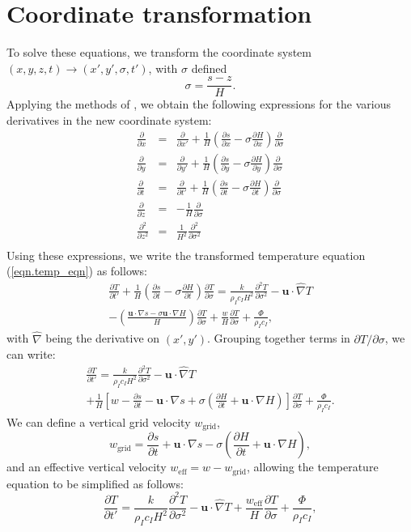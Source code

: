 \documentclass[10pt,english,a4paper]{article}
\newcommand{\diffn}[2]{\ensuremath{\frac{\partial #1}{\partial #2}}}
\newcommand{\diffnsq}[2]{\ensuremath{\frac{\partial^2 #1}{\partial #2^2}}}
\begin{document}
\section{Coordinate transformation}
%
To solve these equations, we transform the coordinate system
$(x,y,z,t)\rightarrow (x',y',\sigma,t')$, with $\sigma$ defined
%
\begin{equation}
\sigma = \frac{s-z}{H}.
\label{eqn.defn_sigma}
\end{equation}
%
Applying the methods of \citet{Hindmarsh1988}, we obtain the following
expressions for the various derivatives in the new coordinate system:
%
\begin{eqnarray}
\diffn{}{x} &=& \diffn{}{x'}+\frac{1}{H}\left(\diffn{s}{x}-\sigma\diffn{H}{x}\right)\diffn{}{\sigma}\\
\diffn{}{y} &=& \diffn{}{y'}+\frac{1}{H}\left(\diffn{s}{y}-\sigma\diffn{H}{y}\right)\diffn{}{\sigma}\\
\diffn{}{t} &=& \diffn{}{t'}+\frac{1}{H}\left(\diffn{s}{t}-\sigma\diffn{H}{t}\right)\diffn{}{\sigma}\\
\diffn{}{z} &=& -\frac{1}{H}\diffn{}{\sigma}\\
\diffnsq{}{z} &=& \frac{1}{H^2}\diffnsq{}{\sigma}\\
\end{eqnarray}
%
Using these expressions, we write the transformed temperature equation
(\ref{eqn.temp_eqn}) as follows:
%
\begin{multline}
\diffn{T}{t'}+\frac{1}{H}\left(\diffn{s}{t}-\sigma\diffn{H}{t}\right)\diffn{T}{\sigma}
= \frac{k}{\rho_I c_I H^2}\diffnsq{T}{\sigma} -
\mathbf{u}\cdot\hat{\nabla}T\\ 
- \left(\frac{\mathbf{u}\cdot \nabla s
  -\sigma \mathbf{u}\cdot\nabla H}{H}\right)\diffn{T}{\sigma} +\frac{w}{H}\diffn{T}{\sigma}+\frac{\Phi}{\rho_I c_I},
\end{multline}
%
with $\hat{\nabla}$ being the derivative on $(x',y')$. Grouping
together terms in $\partial T/\partial \sigma$, we can write:
%
\begin{multline}
\diffn{T}{t'} = \frac{k}{\rho_I c_I H^2}\diffnsq{T}{\sigma} -
\mathbf{u}\cdot\hat{\nabla}T\\
+\frac{1}{H}\left[w-\diffn{s}{t}-\mathbf{u}\cdot \nabla s + \sigma
\left( \diffn{H}{t} +\mathbf{u}\cdot\nabla H \right) \right]\diffn{T}{\sigma}+\frac{\Phi}{\rho_I c_I}.
\end{multline}
%
We can define a vertical grid velocity $w_{\mathrm{grid}}$,
%
\begin{equation}
w_{\mathrm{grid}}=\diffn{s}{t}+\mathbf{u}\cdot \nabla s - \sigma
\left( \diffn{H}{t} +\mathbf{u}\cdot\nabla H \right),
\end{equation}
%
and an effective vertical velocity $w_{\mathrm{eff}}=w-w_{\mathrm{grid}}$, allowing the temperature equation to be simplified as follows:
%
\begin{equation}
\frac{\partial T}{\partial t'} = \frac{k}{\rho_I c_I
  H^2}\frac{\partial^2 T}{\partial \sigma^2}
  - \mathbf{u}\cdot\hat{\nabla}T
  + \frac{w_{\mathrm{eff}}}{H}\frac{\partial T}{\partial
  \sigma}+\frac{\Phi}{\rho_I c_I}, 
\label{eqn.simple_temp}
\end{equation}
%
\end{document}
